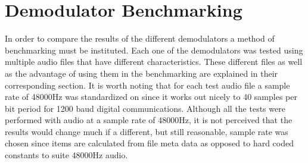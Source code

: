 \chapter{Demodulator Benchmarking}
In order to compare the results of the different demodulators a method of benchmarking must be instituted. Each one of the demodulators was tested using multiple audio files that have different characteristics. These different files as well as the advantage of using them in the benchmarking are explained in their corresponding section. It is worth noting that for each test audio file a sample rate of 48000Hz was standardized on since it works out nicely to 40 samples per bit period for 1200 baud digital communications. Although all the tests were performed with audio at a sample rate of 48000Hz, it is not perceived that the results would change much if a different, but still reasonable, sample rate was chosen since items are calculated from file meta data as opposed to hard coded constants to suite 48000Hz audio.

